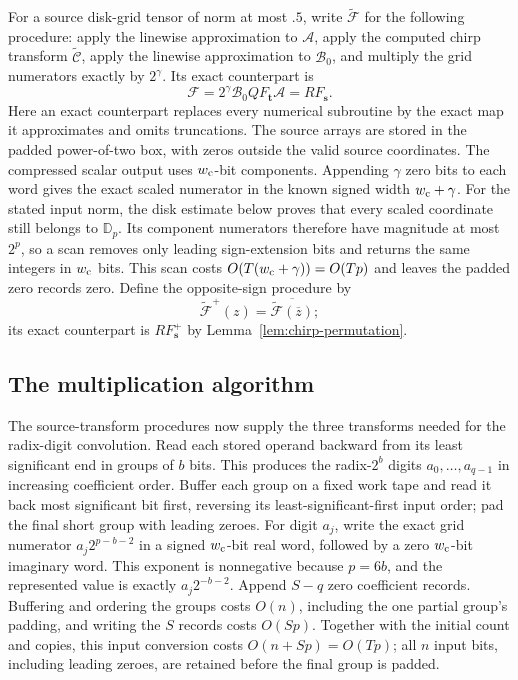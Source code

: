 For a source disk-grid tensor of norm at most $.5$, write
$\widetilde{\mathscr F}$ for the following procedure: apply the linewise
approximation to $\mathcal A$, apply the
computed chirp transform $\widetilde{\mathscr C}$, apply the linewise
approximation to $\mathcal B_0$, and multiply the grid numerators
exactly by $2^\gamma$.  Its exact counterpart is
\[
 \mathscr F=2^\gamma\mathcal B_0QF_{\boldsymbol t}\mathcal A
            =RF_{\boldsymbol s}.
\]
Here an exact counterpart replaces every numerical subroutine by the
exact map it approximates and omits truncations.  The source arrays are
stored in the padded power-of-two box, with zeros outside the valid
source coordinates.
The compressed scalar output uses $w_{\rm c}$-bit components. Appending
$\gamma$ zero bits to each word gives the exact scaled numerator in the
known signed width $w_{\rm c}+\gamma$. For the stated input norm, the
disk estimate below proves that every scaled coordinate still belongs to
$\mathbb D_p$. Its component numerators therefore have magnitude at most
$2^p$, so a scan removes only leading sign-extension bits and returns
the same integers in $w_{\rm c}$ bits. This scan costs
$O(T(w_{\rm c}+\gamma))=O(Tp)$ and leaves the padded zero records zero.
Define the opposite-sign procedure by
\[
 \widetilde{\mathscr F}^{+}(z)
   =\overline{\widetilde{\mathscr F}(\overline z)};
\]
its exact counterpart is $RF_{\boldsymbol s}^{+}$ by
Lemma~\ref{lem:chirp-permutation}.

\subsection{The multiplication algorithm}

The source-transform procedures now supply the three transforms needed
for the radix-digit convolution. Read each stored operand backward from
its least significant end in groups of $b$ bits. This produces the radix-$2^b$ digits
$a_0,\ldots,a_{q-1}$ in increasing coefficient order.  Buffer each
group on a fixed work tape and read it back most significant bit first,
reversing its least-significant-first input order; pad the final short
group with leading zeroes.
For digit $a_j$, write the exact grid numerator
$a_j2^{p-b-2}$ in a signed $w_{\rm c}$-bit real word, followed by a zero
$w_{\rm c}$-bit imaginary word. This exponent is nonnegative
because $p=6b$, and the represented value is exactly $a_j2^{-b-2}$.
Append $S-q$ zero coefficient records.  Buffering and ordering the
groups costs $O(n)$, including the one partial group's padding, and
writing the $S$ records costs $O(Sp)$.
Together with the initial count and copies, this input conversion
costs $O(n+Sp)=O(Tp)$; all $n$ input bits, including leading zeroes,
are retained before the final group is padded.

